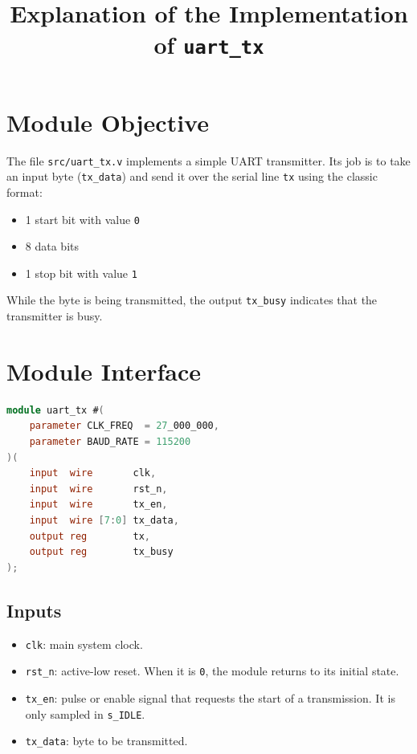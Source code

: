 \documentclass[12pt]{article}
\title{Explanation of the Implementation of \texttt{uart\_tx}}
\author{}
\date{}
\begin{document}
\maketitle

\section{Module Objective}

The file \texttt{src/uart\_tx.v} implements a simple UART transmitter. Its job is to take an input byte (\texttt{tx\_data}) and send it over the serial line \texttt{tx} using the classic format:

\begin{itemize}
    \item 1 start bit with value \texttt{0}
    \item 8 data bits
    \item 1 stop bit with value \texttt{1}
\end{itemize}

While the byte is being transmitted, the output \texttt{tx\_busy} indicates that the transmitter is busy.

\section{Module Interface}

\begin{lstlisting}[language=Verilog]
module uart_tx #(
    parameter CLK_FREQ  = 27_000_000,
    parameter BAUD_RATE = 115200
)(
    input  wire       clk,
    input  wire       rst_n,
    input  wire       tx_en,
    input  wire [7:0] tx_data,
    output reg        tx,
    output reg        tx_busy
);
\end{lstlisting}

\subsection*{Inputs}

\begin{itemize}
    \item \texttt{clk}: main system clock.
    \item \texttt{rst\_n}: active-low reset. When it is \texttt{0}, the module returns to its initial state.
    \item \texttt{tx\_en}: pulse or enable signal that requests the start of a transmission. It is only sampled in \texttt{s\_IDLE}.
    \item \texttt{tx\_data}: byte to be transmitted.
\end{itemize}
\end{document}
